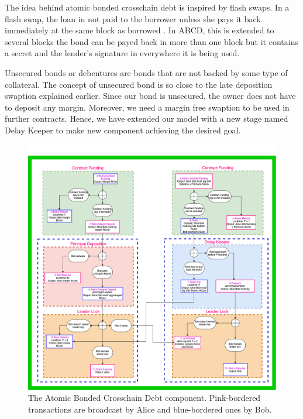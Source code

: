 The idea behind atomic bonded crosschain debt is inspired by flash swaps. In a flash swap, the loan in not paid to the borrower unless she pays it back immediately at the same block as borrowed \cite{flashswaps}. In ABCD, this is extended to several blocks \ie  the bond can be payed back in more than one block but it contains a secret and the lender's signature in everywhere it is being used. 

Unsecured bonds or debentures are bonds that are not backed by some type of collateral. The concept of unsecured bond is so close to the late deposition swaption explained earlier. Since our bond is unsecured, the owner does not have to deposit any margin. Moreover, we need a margin free swaption to be used in further contracts. Hence, we have extended our \MetaSwaption model with a new stage named Delay Keeper to make new component achieving the desired goal.


\begin{figure}
    \centering
    \includegraphics[width=\textwidth]{figures/non-collateralized-bond-no-checkseq.png}
    \caption{The Atomic Bonded Crosschain Debt component. Pink-bordered transactions are broadcast by Alice and blue-bordered ones by Bob.}
    \label{fig:non-collat-bond-no-checkseq}
\end{figure}

